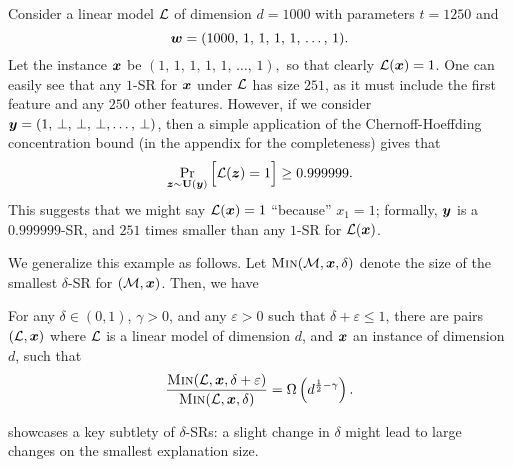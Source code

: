 

\begin{example}
Consider a linear model $\mathcal{L}$ of dimension $d= 1000$ with parameters $t = 1250$ and
$$
	{\bm{w}} = (
		1000, \, 1, \, 1, \,  1, \,  1, \,  \ldots, \, 1
	).
$$
Let the instance ${\bm{x}}$ be 
	$(
		1, \, 1, \, 1, \,  1, \,  1, \,  \ldots, \, 1
	),$ so that clearly $\mathcal{L}({\bm{x}}) = 1$.
One can easily see that any $1$-SR for ${\bm{x}}$ under $\mathcal{L}$ has size $251$, as it must include the first feature and any $250$ other features.
However, if we consider ${\bm{y}} = (
		1, \, \bot, \, \bot, \,  \bot,  \ldots, \, \bot
	)$, then a simple application of the Chernoff-Hoeffding concentration bound (in the appendix for the completeness) gives that
\[
	\Pr_{{\bm{z}} \sim \mathbf{U}({\bm{y}})}\Big[ \mathcal{L}({\bm{z}}) = 1\Big] \geq  0.999999.\]
	This suggests that we might say $\mathcal{L}({\bm{x}}) = 1$ ``because'' $x_1 = 1$; formally, ${\bm{y}}$ is a $0.999999$-SR, and $251$ times smaller than any $1$-SR for $\mathcal{L}({\bm{x}})$.
\label{ex:delta-sr-size}
\end{example}

We generalize this example as follows. Let $\operatorname{\textsc{Min}}(\mathcal{M}, {\bm{x}}, \delta)$ denote the size of the smallest $\delta$-SR for $(\mathcal{M}, {\bm{x}})$. Then, we have 
\begin{proposition}\label{prop:delta-sr-size}
	For any $\delta \in (0, 1)$, $\gamma > 0$, and any $\varepsilon > 0$ such that $\delta + \varepsilon \leq 1$, there are pairs $(\mathcal{L}, {\bm{x}})$ where $\mathcal{L}$ is a linear model of dimension $d$, and ${\bm{x}}$ an instance of dimension $d$, such that
	\[ 
		\frac{\operatorname{\textsc{Min}}(\mathcal{L}, {\bm{x}}, \delta+\varepsilon)}{\operatorname{\textsc{Min}}(\mathcal{L}, {\bm{x}}, \delta)} = \Omega\left(d^{\frac{1}{2} - \gamma}\right).
	\]
\end{proposition}
 showcases a key subtlety of $\delta$-SRs: a slight change in $\delta$ might lead to large changes on the smallest explanation size.


